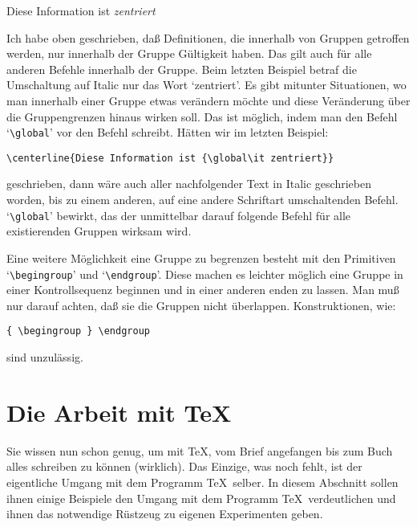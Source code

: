 \centerline{Diese Information ist {\it zentriert}}\medskip

Ich habe oben geschrieben, da\ss{} 
Definitionen, die innerhalb von Gruppen
getroffen werden, nur innerhalb der Gruppe G\"ultigkeit haben. Das gilt
auch f\"ur alle anderen Befehle innerhalb der Gruppe. Beim letzten
Beispiel betraf die Umschaltung auf 
Italic nur das Wort `zentriert'. Es
gibt mitunter Situationen, wo man innerhalb einer Gruppe etwas
ver\"andern m\"ochte und diese Ver\"anderung \"uber die 
Gruppengrenzen hinaus wirken soll. Das ist m\"oglich, indem man den Befehl
`\verb|\global|' vor den
Befehl schreibt. H\"atten wir im letzten Beispiel:
\begin{verbatim}
\centerline{Diese Information ist {\global\it zentriert}}
\end{verbatim}
geschrieben, dann w\"are auch aller nachfolgender Text in 
Italic
geschrieben worden, bis zu einem anderen, auf eine andere Schriftart
umschaltenden Befehl. 
`\verb|\global|' bewirkt, das der unmittelbar
darauf folgende Befehl f\"ur alle existierenden Gruppen wirksam wird.

Eine weitere M\"oglichkeit eine Gruppe zu begrenzen besteht mit den
 Primitiven 
`\verb|\begingroup|' und `\verb|\endgroup|'. Diese
machen es leichter m\"oglich eine Gruppe in einer
Kontrollsequenz
beginnen und in einer anderen enden zu lassen. Man mu\ss{} nur darauf
achten, da\ss{} sie die 
Gruppen nicht \"uberlappen. Konstruktionen, wie:
\begin{verbatim}
{ \begingroup } \endgroup
\end{verbatim}
sind unzul\"assig.

\section{Die Arbeit mit \TeX}
Sie wissen nun schon genug, um mit \TeX, vom Brief angefangen bis zum
Buch alles schreiben zu k\"onnen (wirklich). Das Einzige, was noch
fehlt, ist der eigentliche Umgang mit dem Programm \TeX\ selber. In
diesem Abschnitt sollen ihnen einige Beispiele den Umgang mit dem
Programm \TeX\ verdeutlichen und ihnen das notwendige R\"ustzeug zu
eigenen Experimenten geben.


